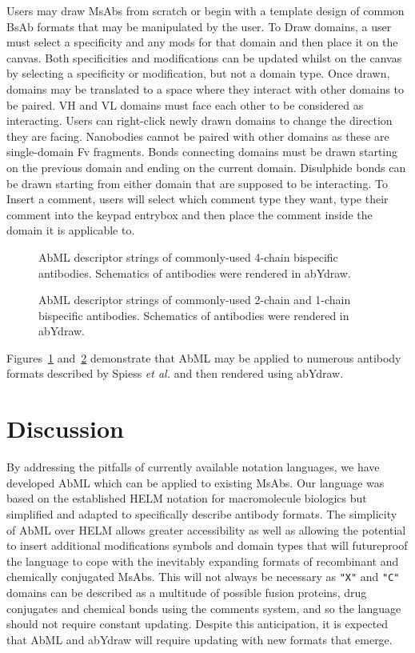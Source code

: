 \documentclass{article}
\newcommand{\etal}{\emph{et al.}}
\let\shortcite\cite
\begin{document}
Users may draw MsAbs from scratch or begin with a template design of
common BsAb formats that may be manipulated by the user. To Draw
domains, a user must select a specificity and any mods for that domain
and then place it on the canvas. Both specificities and modifications
can be updated whilst on the canvas by selecting a specificity or
modification, but not a domain type. Once drawn, domains may be
translated to a space where they interact with other domains to be
paired. VH and VL domains must face each other to be considered as
interacting. Users can right-click newly drawn domains to change the
direction they are facing. Nanobodies cannot be paired with other
domains as these are single-domain Fv fragments. Bonds connecting
domains must be drawn starting on the previous domain and ending on
the current domain. Disulphide bonds can be drawn starting from either
domain that are supposed to be interacting. To Insert a comment, users
will select which comment type they want, type their comment into the
keypad entrybox and then place the comment inside the domain it is
applicable to.  

\begin{figure}
\caption{\label{fig:2} AbML descriptor strings of commonly-used
4-chain bispecific antibodies. Schematics of antibodies were rendered
in abYdraw.} 
\end{figure}

\begin{figure}
\caption{\label{fig:3} AbML descriptor strings of commonly-used
2-chain and 1-chain bispecific antibodies. Schematics of antibodies
were rendered in abYdraw.} 
\end{figure}

Figures~\ref{fig:2} and~\ref{fig:3} demonstrate that AbML may be
applied to numerous antibody formats described by Spiess \etal
\shortcite{spiess:2015} and then rendered using abYdraw.


\section{Discussion}

By addressing the pitfalls of currently available notation languages,
we have developed AbML which can be applied to existing MsAbs. Our
language was based on the established HELM notation for macromolecule
biologics but simplified and adapted to specifically describe antibody
formats. The simplicity of AbML over HELM allows greater accessibility
as well as allowing the potential to insert additional modifications
symbols and domain types that will futureproof the language to cope
with the inevitably expanding formats of recombinant and chemically
conjugated MsAbs. This will not always be necessary as \verb|"X"| and \verb|"C"|
domains can be described as a multitude of possible fusion proteins,
drug conjugates and chemical bonds using the comments system, and so
the language should not require constant updating. Despite this
anticipation, it is expected that AbML and abYdraw will require
updating with new formats that emerge. 
\end{document}
